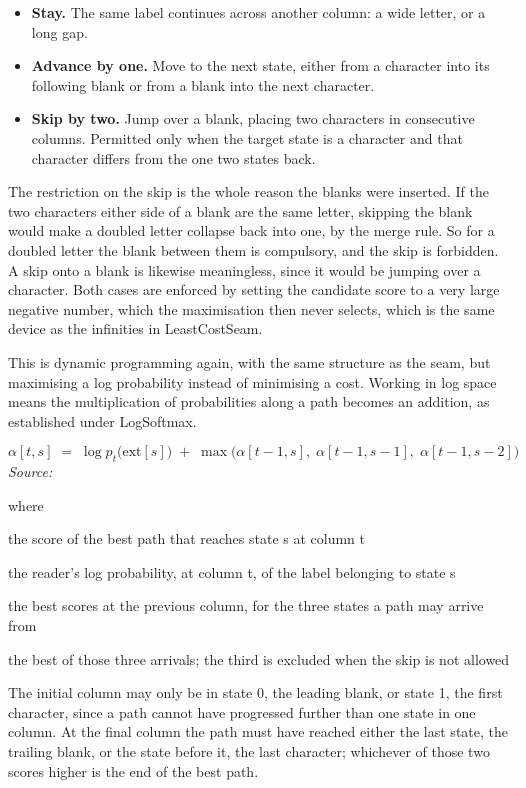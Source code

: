 \begin{itemize}\setlength\itemsep{0pt}
  \item \textbf{Stay.} The same label continues across another column: a wide letter, or a long gap.
  \item \textbf{Advance by one.} Move to the next state, either from a character into its following blank or from a blank into the next character.
  \item \textbf{Skip by two.} Jump over a blank, placing two characters in consecutive columns. Permitted only when the target state is a character and that character differs from the one two states back.
\end{itemize}
The restriction on the skip is the whole reason the blanks were inserted. If the two characters either side of a blank are the same letter, skipping the blank would make a doubled letter collapse back into one, by the merge rule. So for a doubled letter the blank between them is compulsory, and the skip is forbidden. A skip onto a blank is likewise meaningless, since it would be jumping over a character. Both cases are enforced by setting the candidate score to a very large negative number, which the maximisation then never selects, which is the same device as the infinities in LeastCostSeam.


This is dynamic programming again, with the same structure as the seam, but maximising a log probability instead of minimising a cost. Working in log space means the multiplication of probabilities along a path becomes an addition, as established under LogSoftmax.


\begin{equation}
\alpha[t,s] \;=\; \log p_t\big(\mathrm{ext}[s]\big) \;+\; \max\Big( \alpha[t-1,s],\; \alpha[t-1,s-1],\; \alpha[t-1,s-2] \Big)
\end{equation}
\noindent\emph{Source: }\cite{graves2006}


\noindent where
\begin{description}[leftmargin=2.4em,style=nextline,font=\normalfont\ttfamily]\setlength\itemsep{1pt}
  \item[{$\alpha[t,s]$}] \normalfont the score of the best path that reaches state s at column t
  \item[{$\log p_t(\mathrm{ext}[s])$}] \normalfont the reader's log probability, at column t, of the label belonging to state s
  \item[{$\alpha[t-1,\,\cdot\,]$}] \normalfont the best scores at the previous column, for the three states a path may arrive from
  \item[{$\max$}] \normalfont the best of those three arrivals; the third is excluded when the skip is not allowed
\end{description}
The initial column may only be in state 0, the leading blank, or state 1, the first character, since a path cannot have progressed further than one state in one column. At the final column the path must have reached either the last state, the trailing blank, or the state before it, the last character; whichever of those two scores higher is the end of the best path.


